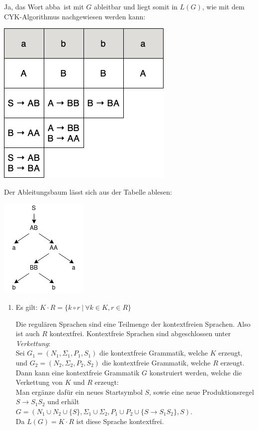 \begin{teile}
	\item
	Ja, das Wort \glqq abba\grqq\ ist mit $G$ ableitbar und liegt somit in $L(G)$, wie mit dem CYK-Algorithmus nachgewiesen werden kann:
	
	\begin{center}
		\includegraphics[scale=0.45]{CYK-Pyramide.png}
	\end{center}
	
	Der Ableitungsbaum lässt sich aus der Tabelle ablesen:
	
	\begin{center}
		\includegraphics[scale=0.7]{Ableitungsbaum.png}
	\end{center}
		
	\item
	\begin{enumerate}[label=\roman*.]
		\item
		Es gilt: $K\cdot R = \{k\circ r\ |\ \forall k \in K, r \in R\}$

		Die regulären Sprachen sind eine Teilmenge der kontextfreien Sprachen.
		Also ist auch $R$ kontextfrei. Kontextfreie Sprachen sind abgeschlossen unter \emph{Verkettung}: \\
		Sei $G_1 = (N_1, \Sigma_1, P_1, S_1)$ die kontextfreie Grammatik, welche $K$ erzeugt, und $G_2 = (N_2, \Sigma_2, P_2, S_2)$ die kontextfreie Grammatik, welche $R$ erzeugt. Dann kann eine kontextfreie Grammatik $G$ konstruiert werden, welche die Verkettung von $K$ und $R$ erzeugt:\\
		Man ergänze dafür ein neues Startsymbol $S$, sowie eine neue Produktionsregel $S \rightarrow S_1S_2$ und erhält $G = (N_1 \cup N_2 \cup \{S\}, \Sigma_1 \cup \Sigma_2, P_1 \cup P_2 \cup \{S \rightarrow S_1S_2\}, S)$.\\
		Da $L(G)=K\cdot R$ ist diese Sprache kontextfrei.


\end{enumerate}
\end{teile}
